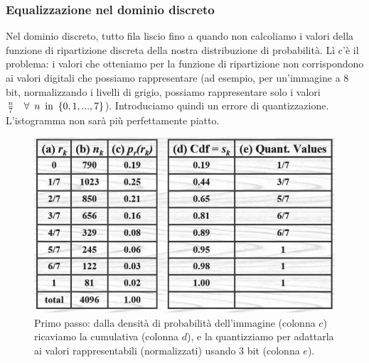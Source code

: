 \documentclass[a4paper,11pt]{article}
\begin{document}
\subsubsection{Equalizzazione nel dominio discreto}
Nel dominio discreto, tutto fila liscio fino a quando non calcoliamo i valori della funzione di ripartizione discreta della nostra distribuzione
di probabilità. Lì c'è il problema: i valori che otteniamo per la funzione di ripartizione non corrispondono ai valori digitali che possiamo rappresentare
(ad esempio, per un'immagine a 8 bit, normalizzando i livelli di grigio, possiamo rappresentare solo i valori
$\frac{n}{7} \quad \forall \enskip n \enskip \textrm{in} \enskip \{0, 1, ..., 7\}$). Introduciamo quindi un errore di quantizzazione. L'istogramma
non sarà più perfettamente piatto.
\newpage

\renewcommand{\thefigure}{5.16}
\begin{figure}[!h]
  \centering
    \includegraphics[scale=0.35]{images/5/eq_example_1.png}
    \caption{Primo passo: dalla densità di probabilità dell'immagine (colonna $c$) ricaviamo la cumulativa (colonna $d$), e la quantizziamo per adattarla ai valori rappresentabili (normalizzati) usando 3 bit (colonna $e$).}
\end{figure}
\end{document}
